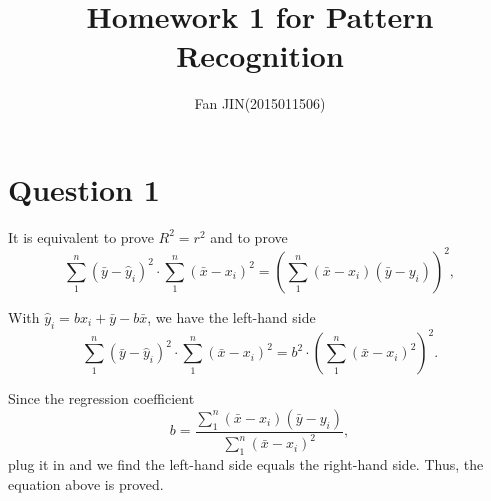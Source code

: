 \documentclass{article}
\begin{document}
\title{\textsf{Homework 1 for Pattern Recognition}}
\author{Fan JIN\quad (2015011506)}
\maketitle

\section*{Question 1}
{
    It is equivalent to prove $R^2 = r^2$ and to prove $$\sum_1^n (\bar{y} - \hat{y}_i)^2 \cdot \sum_1^n (\bar{x} - x_i)^2 = (\sum_1^n (\bar{x} - x_i)(\bar{y} - y_i))^2,$$

    With $\hat{y}_i = b x_i + \bar{y} - b \bar{x}$, we have the left-hand side
    $$\sum_1^n (\bar{y} - \hat{y}_i)^2 \cdot \sum_1^n (\bar{x} - x_i)^2 = b^2 \cdot (\sum_1^n (\bar{x} - x_i)^2)^2.$$

    Since the regression coefficient $$b = \frac{\sum_1^n (\bar{x} - x_i)(\bar{y} - y_i)}{\sum_1^n (\bar{x} - x_i)^2},$$ plug it in and we find the left-hand side equals the right-hand side. Thus, the equation above is proved.
}
\end{document}

